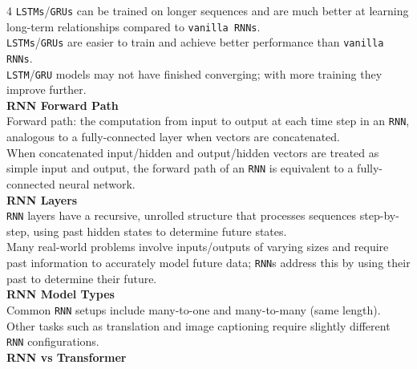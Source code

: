 \documentclass[8pt]{extarticle}
\begin{document}
\begin{multicols}{4}
\texttt{LSTMs}/\texttt{GRUs} can be trained on longer sequences and are much better at learning long-term relationships compared to \texttt{vanilla RNNs}.\\
\texttt{LSTMs}/\texttt{GRUs} are easier to train and achieve better performance than \texttt{vanilla RNNs}.\\
\texttt{LSTM}/\texttt{GRU} models may not have finished converging; with more training they improve further.\\
\vspace{2pt}\textbf{RNN Forward Path}\\
Forward path: the computation from input to output at each time step in an \texttt{RNN}, analogous to a fully-connected layer when vectors are concatenated.\\
When concatenated input/hidden and output/hidden vectors are treated as simple input and output, the forward path of an \texttt{RNN} is equivalent to a fully-connected neural network.\\
\vspace{2pt}\textbf{RNN Layers}\\
\texttt{RNN} layers have a recursive, unrolled structure that processes sequences step-by-step, using past hidden states to determine future states.\\
Many real-world problems involve inputs/outputs of varying sizes and require past information to accurately model future data; \texttt{RNN}s address this by using their past to determine their future.\\
\vspace{2pt}\textbf{RNN Model Types}\\
Common \texttt{RNN} setups include many-to-one and many-to-many (same length). Other tasks such as translation and image captioning require slightly different \texttt{RNN} configurations.\\
\vspace{2pt}\textbf{RNN vs Transformer}\\


\end{multicols}
\end{document}
